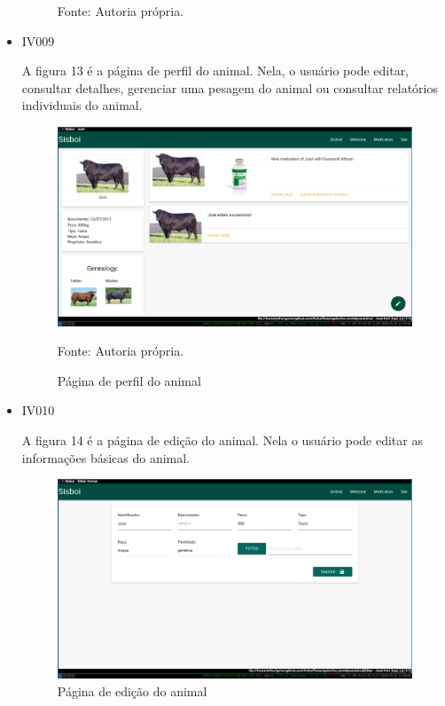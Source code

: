 \begin{itemize}
\begin{figure}[H]
\begin{center}
		Fonte: Autoria própria.
	\end{center}
\end{figure}

\item IV009

A figura 13 é a página de perfil do animal. Nela, o usuário pode editar, consultar detalhes, gerenciar uma pesagem do animal ou consultar relatórios individuais do animal.
\begin{figure}[H]
	\begin{center}
		\caption{Página de perfil do animal}
		\includegraphics[width=\textwidth]{../img/prototipos/perfil.png}

		Fonte: Autoria própria.
	\end{center}
\end{figure}


\item IV010

A figura 14 é a página de edição do animal. Nela o usuário pode editar as informações básicas do animal.
\begin{figure}[]
	\begin{center}
		\caption{Página de edição do animal}
		\includegraphics[width=\textwidth]{../img/prototipos/editar.png}


\end{center}
\end{figure}
\end{itemize}
